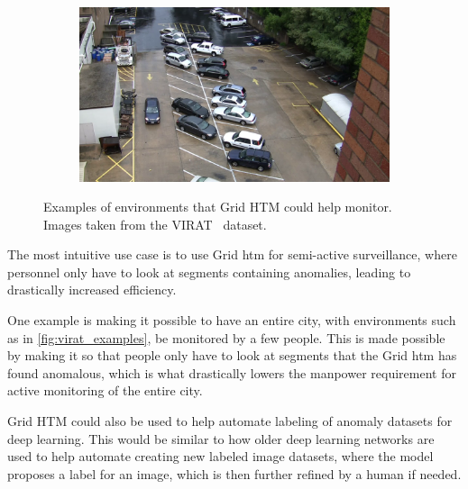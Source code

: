 \begin{figure}[H]
\begin{subfigure}{0.49\linewidth}
    \end{subfigure}
    \begin{subfigure}{0.49\linewidth}
        \includegraphics[width=\linewidth]{resources/methodology/surveillance_example4.png}
    \end{subfigure}
    \caption[Grid HTM Environments]{Examples of environments that Grid HTM could help monitor. Images taken from the VIRAT~\cite{VIRAT} dataset.}
    \label{fig:virat_examples}
\end{figure}
The most intuitive use case is to use Grid \gls*{htm} for semi-active surveillance, where personnel only have to look at segments containing anomalies, leading to drastically increased efficiency.
\par
One example is making it possible to have an entire city, with environments such as in \autoref{fig:virat_examples}, be monitored by a few people. This is made possible by making it so that people only have to look at segments that the Grid \gls*{htm} has found anomalous, which is what drastically lowers the manpower requirement for active monitoring of the entire city.
\par
Grid HTM could also be used to help automate labeling of anomaly datasets for deep learning. This would be similar to how older deep learning networks are used to help automate creating new labeled image datasets, where the model proposes a label for an image, which is then further refined by a human if needed.

